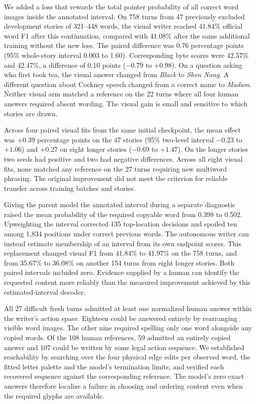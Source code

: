 \documentclass[12pt,a4paper]{article}
\providecommand{\DIFadd}[1]{{\protect\color{blue} \sf #1}} %
\begin{document}
\DIFadd{We added a loss that rewards the total pointer probability of all correct word images inside the annotated interval. On 758 turns from 47 previously excluded development stories of 321--448 words, the visual writer reached 41.84\% official word F1 after this continuation, compared with 41.08\% after the same additional training without the new loss. The paired difference was 0.76 percentage points (95\% whole-story interval 0.003 to 1.60). Corresponding byte scores were 42.57\% and 42.47\%, a difference of 0.10 points ($-0.79$ to $+0.98$). On a question asking who first took tea, the visual answer changed from \emph{Black} to \emph{Shen Nong}. A different question about Cockney speech changed from a correct name to \emph{Madam}. Neither visual arm matched a reference on the 22 turns where all four human answers required absent wording. The visual gain is small and sensitive to which stories are drawn.
}

\DIFadd{Across four paired visual fits from the same initial checkpoint, the mean effect was +0.39 percentage points on the 47 stories (95\% two-level interval $-0.23$ to $+1.06$) and +0.27 on eight longer stories ($-0.69$ to $+1.47$). On the longer stories two seeds had positive and two had negative differences. Across all eight visual fits, none matched any reference on the 27 turns requiring new multiword phrasing. The original improvement did not meet the criterion for reliable transfer across training batches and stories.
}

\DIFadd{Giving the parent model the annotated interval during a separate diagnostic raised the mean probability of the required copyable word from 0.398 to 0.502. Upweighting the interval corrected 135 top-location decisions and spoiled ten among 1,834 positions under correct previous words. The autonomous writer can instead estimate membership of an interval from its own endpoint scores. This replacement changed visual F1 from 41.84\% to 41.97\% on the 758 turns, and from 35.67\% to 36.08\% on another 154 turns from eight longer stories. Both paired intervals included zero. Evidence supplied by a human can identify the requested content more reliably than the measured improvement achieved by this estimated-interval decoder.
}

\DIFadd{All 27 difficult fresh turns admitted at least one normalized human answer within the writer's action space. Eighteen could be answered entirely by rearranging visible word images. The other nine required spelling only one word alongside any copied words. Of the 108 human references, 59 admitted an entirely copied answer and 107 could be written by some legal action sequence. We established reachability by searching over the four physical edge edits per observed word, the fitted letter palette and the model's termination limits, and verified each recovered sequence against the corresponding reference. The model's zero exact answers therefore localize a failure in choosing and ordering content even when the required glyphs are available.
}
\end{document}
